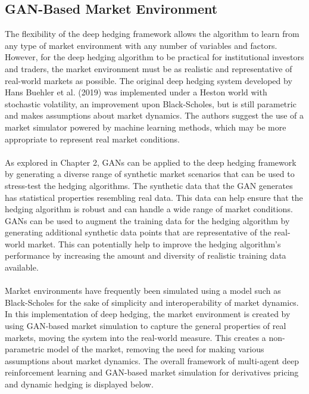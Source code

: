 \subsection{GAN-Based Market Environment}
The flexibility of the deep hedging framework allows the algorithm to learn from any type of market environment with any number of variables and factors. However, for the deep hedging algorithm to be practical for institutional investors and traders, the market environment must be as realistic and representative of real-world markets as possible. The original deep hedging system developed by Hans Buehler et al. (2019) was implemented under a Heston world with stochastic volatility, an improvement upon Black-Scholes, but is still parametric and makes assumptions about market dynamics. The authors suggest the use of a market simulator powered by machine learning methods, which may be more appropriate to represent real market conditions.
\\ \\
As explored in Chapter 2, GANs can be applied to the deep hedging framework by generating a diverse range of synthetic market scenarios that can be used to stress-test the hedging algorithms. The synthetic data that the GAN generates has statistical properties resembling real data. This data can help ensure that the hedging algorithm is robust and can handle a wide range of market conditions. GANs can be used to augment the training data for the hedging algorithm by generating additional synthetic data points that are representative of the real-world market. This can potentially help to improve the hedging algorithm's performance by increasing the amount and diversity of realistic training data available.
\\ \\
Market environments have frequently been simulated using a model such as Black-Scholes for the sake of simplicity and interoperability of market dynamics. In this implementation of deep hedging, the market environment is created by using GAN-based market simulation to capture the general properties of real markets, moving the system into the real-world measure. This creates a non-parametric model of the market, removing the need for making various assumptions about market dynamics. The overall framework of multi-agent deep reinforcement learning and GAN-based market simulation for derivatives pricing and dynamic hedging is displayed below.
